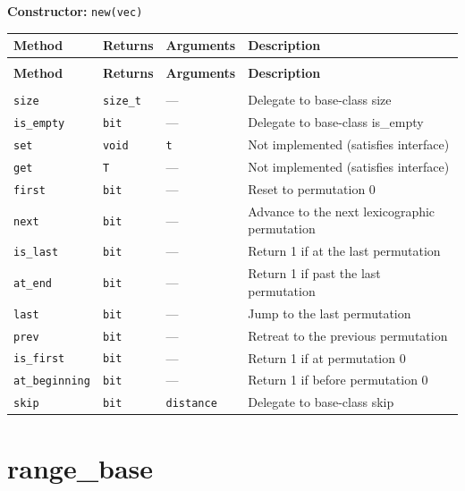 \documentclass[11pt,letterpaper]{report}
\begin{document}
\noindent\textbf{Constructor:} \texttt{new(vec)}

\begin{xltabular}{\linewidth}{>{\small}p{1.35in} >{\small}p{1.25in} >{\small}p{0.95in} >{\small}X}
\toprule
\textbf{Method} & \textbf{Returns} & \textbf{Arguments} & \textbf{Description} \\
\midrule
\endfirsthead
{} \\
\midrule
\textbf{Method} & \textbf{Returns} & \textbf{Arguments} & \textbf{Description} \\
\midrule
\endhead
\midrule
{} \\
\endfoot
\bottomrule
\endlastfoot
\texttt{size} & \texttt{size\_t} & --- & Delegate to base-class size \\
\texttt{is\_empty} & \texttt{bit} & --- & Delegate to base-class is\_empty \\
\texttt{set} & \texttt{void} & \texttt{t} & Not implemented (satisfies interface) \\
\texttt{get} & \texttt{T} & --- & Not implemented (satisfies interface) \\
\texttt{first} & \texttt{bit} & --- & Reset to permutation 0 \\
\texttt{next} & \texttt{bit} & --- & Advance to the next lexicographic permutation \\
\texttt{is\_last} & \texttt{bit} & --- & Return 1 if at the last permutation \\
\texttt{at\_end} & \texttt{bit} & --- & Return 1 if past the last permutation \\
\texttt{last} & \texttt{bit} & --- & Jump to the last permutation \\
\texttt{prev} & \texttt{bit} & --- & Retreat to the previous permutation \\
\texttt{is\_first} & \texttt{bit} & --- & Return 1 if at permutation 0 \\
\texttt{at\_beginning} & \texttt{bit} & --- & Return 1 if before permutation 0 \\
\texttt{skip} & \texttt{bit} & \texttt{distance} & Delegate to base-class skip \\
\end{xltabular}

\section{range\_base}
\label{cls:rangebase}
\end{document}
